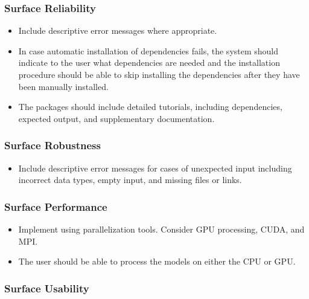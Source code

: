 \documentclass[12pt, notitlepage]{article}
\begin{document}
\subsubsection{Surface Reliability}

\begin{itemize}
	\item Include descriptive error messages where appropriate.
	\item In case automatic installation of dependencies fails, the system should indicate to the user what dependencies are needed and the installation procedure should be able to skip installing the dependencies after they have been manually installed.
	\item The packages should include detailed tutorials, including dependencies, expected output, and supplementary documentation.
\end{itemize}

\subsubsection{Surface Robustness}

\begin{itemize}
	\item Include descriptive error messages for cases of unexpected input  including incorrect data types, empty input, and missing files or links.
\end{itemize}

\subsubsection{Surface Performance}

\begin{itemize}
	\item Implement using parallelization tools. Consider GPU processing, CUDA, and MPI. 
	\item The user should be able to process the models on either the CPU or GPU.
\end{itemize}

\subsubsection{Surface Usability}
\end{document}

